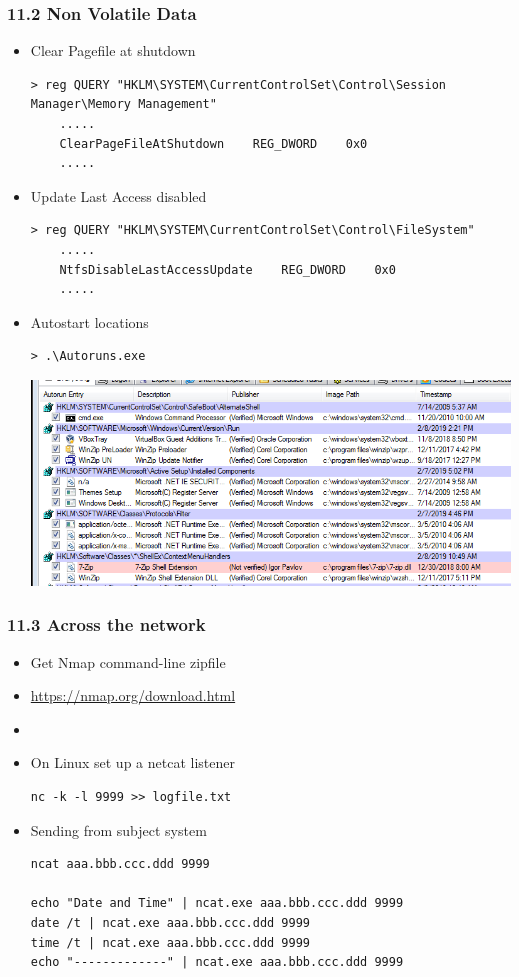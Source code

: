 \begin{frame}[fragile]
  \frametitle{11.2 Non Volatile Data}
  \begin{itemize}
        \item Clear Pagefile at shutdown
\begin{lstlisting}[basicstyle=\tiny]
> reg QUERY "HKLM\SYSTEM\CurrentControlSet\Control\Session Manager\Memory Management"
    .....
    ClearPageFileAtShutdown    REG_DWORD    0x0
    .....
\end{lstlisting}
        \item Update Last Access disabled
\begin{lstlisting}[basicstyle=\tiny]
> reg QUERY "HKLM\SYSTEM\CurrentControlSet\Control\FileSystem"
    .....
    NtfsDisableLastAccessUpdate    REG_DWORD    0x0
    .....
\end{lstlisting}
        \item Autostart locations
\begin{lstlisting}[basicstyle=\tiny]
> .\Autoruns.exe
\end{lstlisting}
\includegraphics[scale=.27]{images/f11_autorun.png}
  \end{itemize}
\end{frame}


\begin{frame}[fragile]
  \frametitle{11.3 Across the network}
  \begin{itemize}
        \item Get Nmap command-line zipfile
	\item[] \url{https://nmap.org/download.html}
	\item[]
        \item On Linux set up a netcat listener
\begin{lstlisting}[basicstyle=\tiny]
nc -k -l 9999 >> logfile.txt
\end{lstlisting}
        \item Sending from subject system
\begin{lstlisting}[basicstyle=\tiny]
ncat aaa.bbb.ccc.ddd 9999

echo "Date and Time" | ncat.exe aaa.bbb.ccc.ddd 9999
date /t | ncat.exe aaa.bbb.ccc.ddd 9999
time /t | ncat.exe aaa.bbb.ccc.ddd 9999
echo "-------------" | ncat.exe aaa.bbb.ccc.ddd 9999
\end{lstlisting}
  \end{itemize}
\end{frame}







